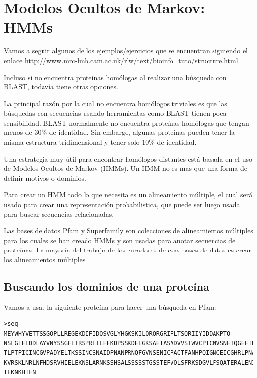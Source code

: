 \documentclass[letter,11pt]{book}
\begin{document}
\section{Modelos Ocultos de Markov: HMMs}

Vamos a seguir algunos de los ejemplos/ejercicios que se encuentran siguiendo el enlace \url{http://www.mrc-lmb.cam.ac.uk/rlw/text/bioinfo_tuto/structure.html}

Incluso si no encuentra proteínas homólogas al realizar una búsqueda con BLAST, todavía tiene otras opciones.

La principal razón por la cual no encuentra homólogos triviales es que las búsquedas con secuencias usando herramientas como BLAST tienen poca sensibilidad. BLAST normalmente no encuentra proteínas homólogas que tengan menos de 30\% de identidad. Sin embargo, algunas proteínas pueden tener la misma estructura tridimensional y tener solo 10\% de identidad.

Una estrategia muy útil para encontrar homólogos distantes está basada en el uso de Modelos Ocultos de Markov (HMMs). Un HMM no es mas que una forma de definir motivos o dominios.

Para crear un HMM todo lo que necesita es un alineamiento múltiple, el cual será usado para crear una representación probabilistica, que puede ser luego usada para buscar secuencias relacionadas.

Las bases de datos Pfam \citep{Finn2010} y {\sc Superfamily} \citep{Wilson2009} son colecciones de alineamientos múltiples para los cuales se han creado HMMs y son usadas para anotar secuencias de proteínas. La mayoría del trabajo de los curadores de esas bases de datos es crear los alineamientos múltiples.

\subsection{Buscando los dominios de una proteína}

Vamos a usar la siguiente proteína para hacer una búsqueda en Pfam:

\begin{Verbatim}[commandchars=!\{\},label=proteína desconocida,frame=topline,fontsize=\scriptsize]
>seq
MEYWHYVETTSSGQPLLREGEKDIFIDQSVGLYHGKSKILQRQRGRIFLTSQRIIYIDDAKPTQ
NSLGLELDDLAYVNYSSGFLTRSPRLILFFKDPSSKDELGKSAETASADVVSTWVCPICMVSNETQGEFTKD
TLPTPICINCGVPADYELTKSSINCSNAIDPNANPRNQFGVNSENICPACTFANHPQIGNCEICGHRLPNAS
KVRSKLNRLNFHDSRVHIELEKNSLARNKSSHSALSSSSSTGSSTEFVQLSFRKSDGVLFSQATERALENIL 
TEKNKHIFN
\end{Verbatim} 
\end{document}
